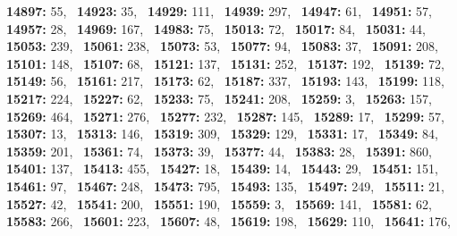 \textbf{14897:} 55,\allowbreak~ 
\textbf{14923:} 35,\allowbreak~ 
\textbf{14929:} 111,\allowbreak~ 
\textbf{14939:} 297,\allowbreak~ 
\textbf{14947:} 61,\allowbreak~ 
\textbf{14951:} 57,\allowbreak~ 
\textbf{14957:} 28,\allowbreak~ 
\textbf{14969:} 167,\allowbreak~ 
\textbf{14983:} 75,\allowbreak~ 
\textbf{15013:} 72,\allowbreak~ 
\textbf{15017:} 84,\allowbreak~ 
\textbf{15031:} 44,\allowbreak~ 
\textbf{15053:} 239,\allowbreak~ 
\textbf{15061:} 238,\allowbreak~ 
\textbf{15073:} 53,\allowbreak~ 
\textbf{15077:} 94,\allowbreak~ 
\textbf{15083:} 37,\allowbreak~ 
\textbf{15091:} 208,\allowbreak~ 
\textbf{15101:} 148,\allowbreak~ 
\textbf{15107:} 68,\allowbreak~ 
\textbf{15121:} 137,\allowbreak~ 
\textbf{15131:} 252,\allowbreak~ 
\textbf{15137:} 192,\allowbreak~ 
\textbf{15139:} 72,\allowbreak~ 
\textbf{15149:} 56,\allowbreak~ 
\textbf{15161:} 217,\allowbreak~ 
\textbf{15173:} 62,\allowbreak~ 
\textbf{15187:} 337,\allowbreak~ 
\textbf{15193:} 143,\allowbreak~ 
\textbf{15199:} 118,\allowbreak~ 
\textbf{15217:} 224,\allowbreak~ 
\textbf{15227:} 62,\allowbreak~ 
\textbf{15233:} 75,\allowbreak~ 
\textbf{15241:} 208,\allowbreak~ 
\textbf{15259:} 3,\allowbreak~ 
\textbf{15263:} 157,\allowbreak~ 
\textbf{15269:} 464,\allowbreak~ 
\textbf{15271:} 276,\allowbreak~ 
\textbf{15277:} 232,\allowbreak~ 
\textbf{15287:} 145,\allowbreak~ 
\textbf{15289:} 17,\allowbreak~ 
\textbf{15299:} 57,\allowbreak~ 
\textbf{15307:} 13,\allowbreak~ 
\textbf{15313:} 146,\allowbreak~ 
\textbf{15319:} 309,\allowbreak~ 
\textbf{15329:} 129,\allowbreak~ 
\textbf{15331:} 17,\allowbreak~ 
\textbf{15349:} 84,\allowbreak~ 
\textbf{15359:} 201,\allowbreak~ 
\textbf{15361:} 74,\allowbreak~ 
\textbf{15373:} 39,\allowbreak~ 
\textbf{15377:} 44,\allowbreak~ 
\textbf{15383:} 28,\allowbreak~ 
\textbf{15391:} 860,\allowbreak~ 
\textbf{15401:} 137,\allowbreak~ 
\textbf{15413:} 455,\allowbreak~ 
\textbf{15427:} 18,\allowbreak~ 
\textbf{15439:} 14,\allowbreak~ 
\textbf{15443:} 29,\allowbreak~ 
\textbf{15451:} 151,\allowbreak~ 
\textbf{15461:} 97,\allowbreak~ 
\textbf{15467:} 248,\allowbreak~ 
\textbf{15473:} 795,\allowbreak~ 
\textbf{15493:} 135,\allowbreak~ 
\textbf{15497:} 249,\allowbreak~ 
\textbf{15511:} 21,\allowbreak~ 
\textbf{15527:} 42,\allowbreak~ 
\textbf{15541:} 200,\allowbreak~ 
\textbf{15551:} 190,\allowbreak~ 
\textbf{15559:} 3,\allowbreak~ 
\textbf{15569:} 141,\allowbreak~ 
\textbf{15581:} 62,\allowbreak~ 
\textbf{15583:} 266,\allowbreak~ 
\textbf{15601:} 223,\allowbreak~ 
\textbf{15607:} 48,\allowbreak~ 
\textbf{15619:} 198,\allowbreak~ 
\textbf{15629:} 110,\allowbreak~ 
\textbf{15641:} 176,\allowbreak~ 
